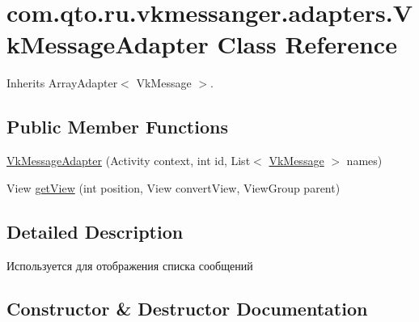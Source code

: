 \hypertarget{classcom_1_1qto_1_1ru_1_1vkmessanger_1_1adapters_1_1_vk_message_adapter}{}\section{com.\+qto.\+ru.\+vkmessanger.\+adapters.\+Vk\+Message\+Adapter Class Reference}
\label{classcom_1_1qto_1_1ru_1_1vkmessanger_1_1adapters_1_1_vk_message_adapter}


Inherits Array\+Adapter$<$ Vk\+Message $>$.

\subsection*{Public Member Functions}
\begin{DoxyCompactItemize}
\item 
\hyperlink{classcom_1_1qto_1_1ru_1_1vkmessanger_1_1adapters_1_1_vk_message_adapter_a528da717f7ea8551dabc2995178a1f94}{Vk\+Message\+Adapter} (Activity context, int id, List$<$ \hyperlink{classcom_1_1qto_1_1ru_1_1vkmessanger_1_1vk_1_1_vk_message}{Vk\+Message} $>$ names)
\item 
View \hyperlink{classcom_1_1qto_1_1ru_1_1vkmessanger_1_1adapters_1_1_vk_message_adapter_aabbe66126b3f12b7c1aa07148106f60e}{get\+View} (int position, View convert\+View, View\+Group parent)
\end{DoxyCompactItemize}


\subsection{Detailed Description}
Используется для отображения списка сообщений 

\subsection{Constructor \& Destructor Documentation}
\hypertarget{classcom_1_1qto_1_1ru_1_1vkmessanger_1_1adapters_1_1_vk_message_adapter_a528da717f7ea8551dabc2995178a1f94}{}
